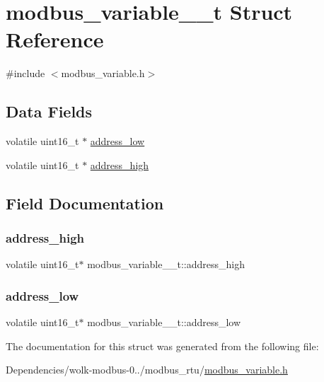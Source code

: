 \hypertarget{structmodbus__variable__32__t}{}\section{modbus\+\_\+variable\+\_\+\_\+t Struct Reference}
\label{structmodbus__variable__32__t}


{\ttfamily \#include $<$modbus\+\_\+variable.\+h$>$}

\subsection*{Data Fields}
\begin{DoxyCompactItemize}
\item 
volatile uint16\+\_\+t $\ast$ \mbox{\hyperlink{structmodbus__variable__32__t_ae7dab0f9754ec53565ed73735cfd3788}{address\+\_\+low}}
\item 
volatile uint16\+\_\+t $\ast$ \mbox{\hyperlink{structmodbus__variable__32__t_a7068d9b21f592f05c799eb79a5293340}{address\+\_\+high}}
\end{DoxyCompactItemize}


\subsection{Field Documentation}
\mbox{\label{structmodbus__variable__32__t_a7068d9b21f592f05c799eb79a5293340}} 
\subsubsection{\texorpdfstring{address\+\_\+high}{address\_high}}
{\footnotesize\ttfamily volatile uint16\+\_\+t$\ast$ modbus\+\_\+variable\+\_\+\_\+t\+::address\+\_\+high}

\mbox{\label{structmodbus__variable__32__t_ae7dab0f9754ec53565ed73735cfd3788}} 
\subsubsection{\texorpdfstring{address\+\_\+low}{address\_low}}
{\footnotesize\ttfamily volatile uint16\+\_\+t$\ast$ modbus\+\_\+variable\+\_\+\_\+t\+::address\+\_\+low}



The documentation for this struct was generated from the following file\+:\begin{DoxyCompactItemize}
\item 
Dependencies/wolk-\/modbus-\/0../modbus\+\_\+rtu/\mbox{\hyperlink{modbus__variable_8h}{modbus\+\_\+variable.\+h}}\end{DoxyCompactItemize}
